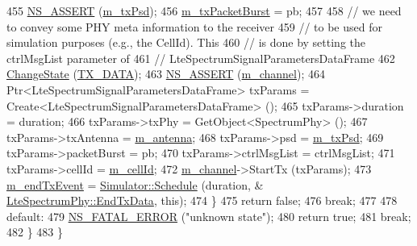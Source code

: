 \begin{DoxyCode}
455       \hyperlink{assert_8h_a6dccdb0de9b252f60088ce281c49d052}{NS\_ASSERT} (\hyperlink{classns3_1_1LteSpectrumPhy_a5db966e9422290886f779dbbf1cbd146}{m\_txPsd});
456       \hyperlink{classns3_1_1LteSpectrumPhy_a9f77709c77cf2b1bcae046b9bc136631}{m\_txPacketBurst} = pb;
457       
458       \textcolor{comment}{// we need to convey some PHY meta information to the receiver}
459       \textcolor{comment}{// to be used for simulation purposes (e.g., the CellId). This}
460       \textcolor{comment}{// is done by setting the ctrlMsgList parameter of}
461       \textcolor{comment}{// LteSpectrumSignalParametersDataFrame}
462       \hyperlink{classns3_1_1LteSpectrumPhy_a64a105b7c580b3d6dc5cd4b97d1223d9}{ChangeState} (\hyperlink{classns3_1_1LteSpectrumPhy_a52ce2cf9b4846807449c50399f6b8000af3e5ba50183ad64a91804f43f1f226c3}{TX\_DATA});
463       \hyperlink{assert_8h_a6dccdb0de9b252f60088ce281c49d052}{NS\_ASSERT} (\hyperlink{classns3_1_1LteSpectrumPhy_a83821e104a67268a379c06cfe65f7417}{m\_channel});
464       Ptr<LteSpectrumSignalParametersDataFrame> txParams = Create<LteSpectrumSignalParametersDataFrame> ();
465       txParams->duration = duration;
466       txParams->txPhy = GetObject<SpectrumPhy> ();
467       txParams->txAntenna = \hyperlink{classns3_1_1LteSpectrumPhy_a99c269c50198172fecd23b2eab9da193}{m\_antenna};
468       txParams->psd = \hyperlink{classns3_1_1LteSpectrumPhy_a5db966e9422290886f779dbbf1cbd146}{m\_txPsd};
469       txParams->packetBurst = pb;
470       txParams->ctrlMsgList = ctrlMsgList;
471       txParams->cellId = \hyperlink{classns3_1_1LteSpectrumPhy_a996732fedbe320aedd9d2def1fc6e3c7}{m\_cellId};
472       \hyperlink{classns3_1_1LteSpectrumPhy_a83821e104a67268a379c06cfe65f7417}{m\_channel}->StartTx (txParams);
473       \hyperlink{classns3_1_1LteSpectrumPhy_a95011c60fa2c99a9295f7ab4420014c0}{m\_endTxEvent} = \hyperlink{classns3_1_1Simulator_a671882c894a08af4a5e91181bf1eec13}{Simulator::Schedule} (duration, &
      \hyperlink{classns3_1_1LteSpectrumPhy_a52f289e3692bf79dfe70d93c70e248fd}{LteSpectrumPhy::EndTxData}, \textcolor{keyword}{this});
474     \}
475     \textcolor{keywordflow}{return} \textcolor{keyword}{false};
476     \textcolor{keywordflow}{break};
477     
478     \textcolor{keywordflow}{default}:
479       \hyperlink{group__fatal_ga5131d5e3f75d7d4cbfd706ac456fdc85}{NS\_FATAL\_ERROR} (\textcolor{stringliteral}{"unknown state"});
480       \textcolor{keywordflow}{return} \textcolor{keyword}{true};
481       \textcolor{keywordflow}{break};
482   \}
483 \}
\end{DoxyCode}


